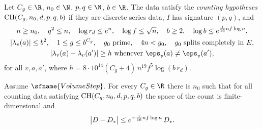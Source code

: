\begin{definition}\label{pf:rows:counthyp}
Let $C_g\in\R$, $n_0\in\N$, $p,q\in\N$, $b\in\R$. The data satisfy the \emph{counting hypotheses}
$\mathrm{CH}(C_g,n_0,d,p,q,b)$ if they are discrete
series data, $I$ has signature $(p,q)$, and
\begin{gather*}
n\ge n_0,\quad q^2\le n,\quad \log r_d\le e^n,\quad \log f\le\sqrt n,\quad b\ge2,\quad \log b\le e^{\frac1{16}nf\log n},\\
|\lambda_v(a)|\le b^2,\quad 1\le g\le b^{C_g},\quad g_0\ \text{prime},\quad 4n<g_0,\quad g_0\ \text{splits completely in }E,\\
|\lambda_v(a)-\lambda_v(a')|\ge h\ \text{whenever}\ \eps_v(a)\ne\eps_v(a'),
\end{gather*}
for all $v,a,a'$, where $h=8\cdot10^{14}(C_g+4)\,n^{19}f^5\log(b\,r_d)$.
\end{definition}

\begin{theorem}\label{pf:rows:counting}
Assume $\sfname{VolumeStep}$. For every $C_g\in\R$ there is $n_0$ such that for all counting data satisfying
$\mathrm{CH}(C_g,n_0,d,p,q,b)$ the space of the count is finite-dimensional and
\[
\bigl|D-D_*\bigr|\le e^{-\frac1{16}nf\log n}\,D_* .
\]
\end{theorem}

